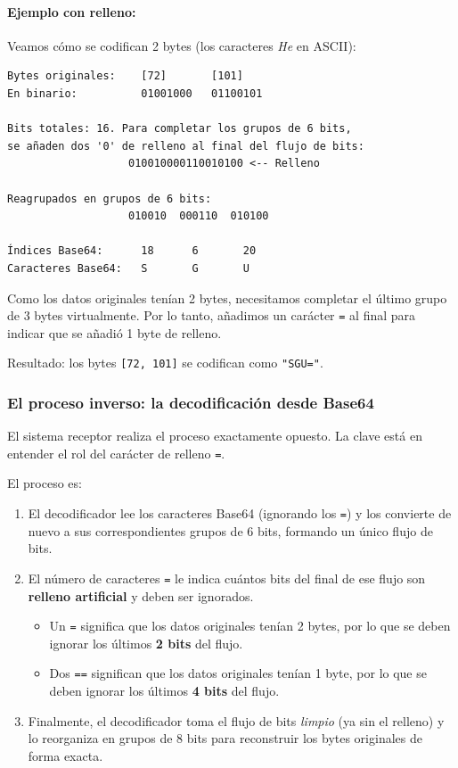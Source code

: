 \paragraph{Ejemplo con relleno:}
Veamos cómo se codifican 2 bytes (los caracteres \emph{He} en ASCII):
\begin{lstlisting}[basicstyle=\ttfamily\small]
Bytes originales:    [72]       [101]
En binario:          01001000   01100101

Bits totales: 16. Para completar los grupos de 6 bits, 
se añaden dos '0' de relleno al final del flujo de bits:
                   010010000110010100 <-- Relleno

Reagrupados en grupos de 6 bits:
                   010010  000110  010100
          
Índices Base64:      18      6       20
Caracteres Base64:   S       G       U
\end{lstlisting}
Como los datos originales tenían 2 bytes, necesitamos completar el último grupo de 3 bytes virtualmente. Por lo tanto, añadimos un carácter \texttt{=} al final para indicar que se añadió 1 byte de relleno.

Resultado: los bytes \texttt{[72, 101]} se codifican como \texttt{"SGU="}.

\subsubsection{El proceso inverso: la decodificación desde Base64}
El sistema receptor realiza el proceso exactamente opuesto. La clave está en entender el rol del carácter de relleno \texttt{=}.

El proceso es:

\begin{enumerate}
    \item El decodificador lee los caracteres Base64 (ignorando los \texttt{=}) y los convierte de nuevo a sus correspondientes grupos de 6 bits, formando un único flujo de bits.
    
    \item El número de caracteres \texttt{=} le indica cuántos bits del final de ese flujo son \textbf{relleno artificial} y deben ser ignorados.
    \begin{itemize}
        \item Un \texttt{=} significa que los datos originales tenían 2 bytes, por lo que se deben ignorar los últimos \textbf{2 bits} del flujo.
        \item Dos \texttt{==} significan que los datos originales tenían 1 byte, por lo que se deben ignorar los últimos \textbf{4 bits} del flujo.
    \end{itemize}
    
    \item Finalmente, el decodificador toma el flujo de bits \emph{limpio} (ya sin el relleno) y lo reorganiza en grupos de 8 bits para reconstruir los bytes originales de forma exacta.
\end{enumerate}

